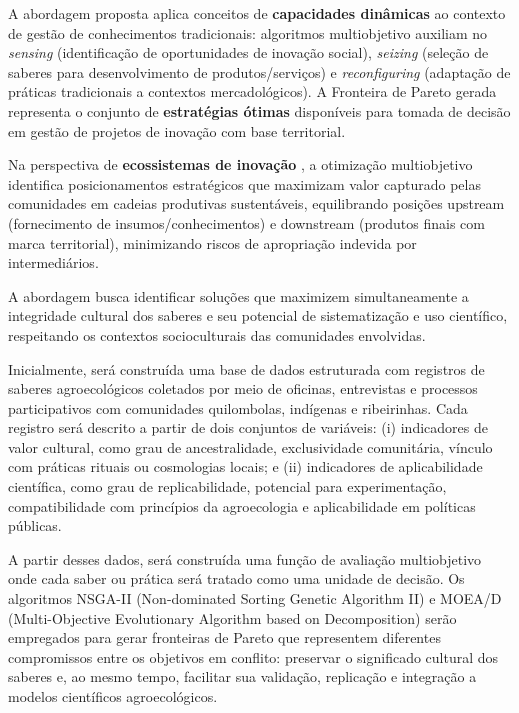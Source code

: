 A abordagem proposta aplica conceitos de \textbf{capacidades dinâmicas} \cite{Teece2007} ao contexto de gestão de conhecimentos tradicionais: algoritmos multiobjetivo auxiliam no \textit{sensing} (identificação de oportunidades de inovação social), \textit{seizing} (seleção de saberes para desenvolvimento de produtos/serviços) e \textit{reconfiguring} (adaptação de práticas tradicionais a contextos mercadológicos). A Fronteira de Pareto gerada representa o conjunto de \textbf{estratégias ótimas} disponíveis para tomada de decisão em gestão de projetos de inovação com base territorial.

Na perspectiva de \textbf{ecossistemas de inovação} \cite{AdnerKapoor2010}, a otimização multiobjetivo identifica posicionamentos estratégicos que maximizam valor capturado pelas comunidades em cadeias produtivas sustentáveis, equilibrando posições upstream (fornecimento de insumos/conhecimentos) e downstream (produtos finais com marca territorial), minimizando riscos de apropriação indevida por intermediários.

A abordagem busca identificar soluções que maximizem simultaneamente a integridade cultural dos saberes e seu potencial de sistematização e uso científico, respeitando os contextos socioculturais das comunidades envolvidas.

Inicialmente, será construída uma base de dados estruturada com registros de saberes agroecológicos coletados por meio de oficinas, entrevistas e processos participativos com comunidades quilombolas, indígenas e ribeirinhas. Cada registro será descrito a partir de dois conjuntos de variáveis: (i) indicadores de valor cultural, como grau de ancestralidade, exclusividade comunitária, vínculo com práticas rituais ou cosmologias locais; e (ii) indicadores de aplicabilidade científica, como grau de replicabilidade, potencial para experimentação, compatibilidade com princípios da agroecologia e aplicabilidade em políticas públicas.

A partir desses dados, será construída uma função de avaliação multiobjetivo onde cada saber ou prática será tratado como uma unidade de decisão. Os algoritmos NSGA-II (Non-dominated Sorting Genetic Algorithm II) e MOEA/D (Multi-Objective Evolutionary Algorithm based on Decomposition) serão empregados para gerar fronteiras de Pareto que representem diferentes compromissos entre os objetivos em conflito: preservar o significado cultural dos saberes e, ao mesmo tempo, facilitar sua validação, replicação e integração a modelos científicos agroecológicos.

